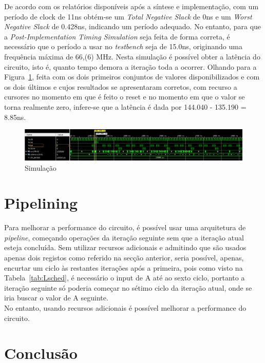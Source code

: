 \documentclass{article} %
\begin{document}
		\noindent De acordo com os relatórios disponíveis após a síntese e implementação, com um período de clock de 11ns obtém-se um \emph{Total Negative Slack} de 0ns e um \emph{Worst Negative Slack} de 0.428ns, indicando um período adequado. No entanto, para que a \emph{Post-Implementation Timing Simulation} seja feita de forma correta, é necessário que o período a usar no \emph{testbench} seja de 15.0ns, originando uma frequência máxima de 66,(6) MHz. Nesta simulação é possível obter a latência do circuito, isto é, quanto tempo demora a iteração toda a ocorrer. Olhando para a Figura~\ref{fig:Sim}, feita com os dois primeiros conjuntos de valores disponibilizados e com os dois últimos e cujos resultados se apresentaram corretos, com recurso a cursores no momento em que é feito o reset e no momento em que o valor se torna realmente zero, infere-se que a latência é dada por 144.040 - 135.190 = 8.85ns.\\ 

		\begin{figure}[ht]
			\begin{center}
				\includegraphics[width=6.5in]{sim.png}
				\caption{Simulação}
				\label{fig:Sim}
			\end{center}
		\end{figure}


	\section{Pipelining}

		Para melhorar a performance do circuito, é possível usar uma arquitetura de \emph{pipeline}, começando operações da iteração seguinte sem que a iteração atual esteja concluída. Sem utilizar recursos adicionais e admitindo que são usados apenas dois registos como referido na secção anterior, seria possível, apenas, encurtar um ciclo às restantes iterações após a primeira, pois como visto na Tabela~\ref{tab:Lsched}, é necessário o input de A até ao sexto ciclo, portanto a iteração seguinte só poderia começar no sétimo ciclo da iteração atual, onde se iria buscar o valor de A seguinte.\\

		\noindent No entanto, usando recursos adicionais é possível melhorar a performance do circuito.

	\section{Conclusão}

	
\end{document}
